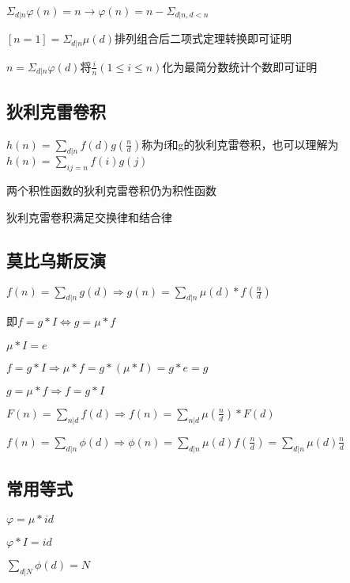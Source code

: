 \documentclass[UTF8]{ctexart}
\begin{document}
$\Sigma_{d|n} \varphi (n)=n\rightarrow \varphi(n)=n-\Sigma_{d|n,d<n}$\par

$[n=1]=\Sigma_{d|n}\mu(d)$排列组合后二项式定理转换即可证明\par

$n=\Sigma_{d|n}\varphi(d)$将$\frac{i}{n}(1\leq i\leq n)$化为最简分数统计个数即可证明\par

\subsection{狄利克雷卷积}

$h(n)=\sum_{d|n}f(d)g(\frac{n}{d})$称为f和g的狄利克雷卷积，也可以理解为$h(n)=\sum_{ij=n}f(i)g(j)$\par

两个积性函数的狄利克雷卷积仍为积性函数\par

狄利克雷卷积满足交换律和结合律\par

\subsection{莫比乌斯反演}

$f(n)=\sum_{d|n}g(d)\Rightarrow g(n)=\sum_{d|n}\mu(d)*f(\frac{n}{d})$\par
即$f=g*I \Leftrightarrow g=\mu*f$\par
$\mu*I=e$\par
$f=g*I \Rightarrow \mu*f = g*(\mu*I)=g*e=g$\par
$g=\mu*f \Rightarrow f=g*I$\par

$F(n)=\sum_{n|d}f(d)\Rightarrow f(n)=\sum_{n|d}\mu(\frac{n}{d})*F(d)$\par

$f(n)=\sum_{d|n}\phi(d)\Rightarrow \phi(n)=\sum_{d|n}\mu(d)f(\frac{n}{d})=\sum_{d|n}\mu(d)\frac{n}{d}$\par

\subsection{常用等式}

$\varphi = \mu * id$\par

$\varphi * I = id$\par

$\sum_{d|N}\phi(d)=N$\par
\end{document}
